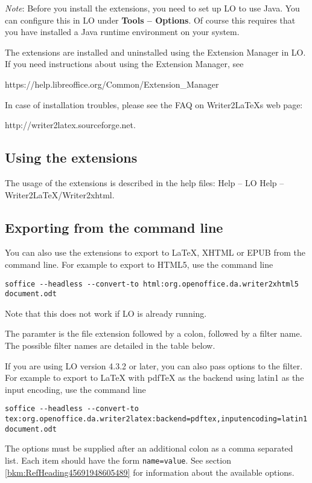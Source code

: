 \documentclass{article}
\newcommand\textstyleInternetlink[1]{#1}
\newcommand\textstyleSourceText[1]{\texttt{\textmd{#1}}}
\begin{document}
{\mdseries
\emph{Note}: Before you install the extensions, you need to set up LO to use Java. You can configure this in LO under \textbf{Tools -- Options}. Of course this requires that you have installed a Java runtime environment on your system.}

{\mdseries
The extensions are installed and uninstalled using the Extension Manager in LO. If you need instructions about using the Extension Manager, see}

\textstyleInternetlink{https://help.libreoffice.org/Common/Extension\_Manager}

{\mdseries
In case of installation troubles, please see the FAQ on Writer2LaTeXs web page:}

{\mdseries
\textstyleInternetlink{http://writer2latex.sourceforge.net}.}

\subsection{Using the extensions}
The usage of the extensions is described in the help files: Help -- LO Help -- Writer2LaTeX/Writer2xhtml.

\subsection{Exporting from the command line}
You can also use the extensions to export to LaTeX, XHTML or EPUB from the command line. For example to export to HTML5, use the command line

\begin{verbatim}
soffice --headless --convert-to html:org.openoffice.da.writer2xhtml5 document.odt
\end{verbatim}
Note that this does not work if LO is already running.

The paramter is the file extension followed by a colon, followed by a filter name. The possible filter names are detailed in the table below.

If you are using LO version 4.3.2 or later, you can also pass options to the filter. For example to export to LaTeX with pdfTeX as the backend using latin1 as the input encoding, use the command line

\begin{verbatim}
soffice --headless --convert-to tex:org.openoffice.da.writer2latex:backend=pdftex,inputencoding=latin1 document.odt
\end{verbatim}
The options must be supplied after an additional colon as a comma separated list. Each item should have the form \textstyleSourceText{name=value}. See section \ref{bkm:RefHeading45691948605489} for information about the available options.
\end{document}
